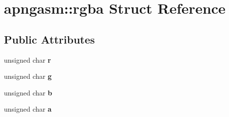 \hypertarget{structapngasm_1_1rgba}{\section{apngasm\-:\-:rgba Struct Reference}
\label{structapngasm_1_1rgba}
}
\subsection*{Public Attributes}
\begin{DoxyCompactItemize}
\item 
\hypertarget{structapngasm_1_1rgba_a6c499067c1f4c5c732173635b328ac09}{unsigned char {\bfseries r}}\label{structapngasm_1_1rgba_a6c499067c1f4c5c732173635b328ac09}

\item 
\hypertarget{structapngasm_1_1rgba_ac5b41fefc90f979c47f9898d9e48e5e9}{unsigned char {\bfseries g}}\label{structapngasm_1_1rgba_ac5b41fefc90f979c47f9898d9e48e5e9}

\item 
\hypertarget{structapngasm_1_1rgba_a5a4fdfec280b2f9ab397c83dc30ff7f8}{unsigned char {\bfseries b}}\label{structapngasm_1_1rgba_a5a4fdfec280b2f9ab397c83dc30ff7f8}

\item 
\hypertarget{structapngasm_1_1rgba_aa74a3de67f39acbc18703aa7d8f4447b}{unsigned char {\bfseries a}}\label{structapngasm_1_1rgba_aa74a3de67f39acbc18703aa7d8f4447b}

\end{DoxyCompactItemize}
